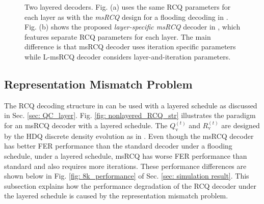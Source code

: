\documentclass [PhD] {uclathes}
\begin{document}
\begin{figure}[t] 
    \centering
\hfill
  \caption{ Two layered decoders. Fig. (a) uses the same RCQ parameters for each layer as with the  \textit{msRCQ} design for a flooding decoding in \cite{Wang2020-RCQ}. Fig. (b) shows the proposed \textit{layer-specific msRCQ} decoder in \cite{Terrill2021-ec}, which features  separate RCQ parameters for each layer.
  The main difference is that msRCQ decoder uses iteration specific parameters while L-msRCQ decoder considers layer-and-iteration parameters.
  }
\end{figure}

\subsection{Representation Mismatch Problem}
The RCQ decoding structure in \cite{Wang2020-RCQ} can be used with a layered schedule as discussed in Sec. \ref{sec: QC_layer}. Fig. \ref{fig: nonlayered_RCQ_str} illustrates the paradigm for an msRCQ decoder with a layered schedule. The $Q_\text{v}^{(t)}$ and $R_\text{v}^{(t)}$ are designed by the HDQ discrete density evolution as in \cite{Wang2020-RCQ}. Even though the msRCQ decoder has better FER performance than the standard \minsum decoder under a flooding schedule\cite{Wang2020-RCQ}, under a layered schedule, msRCQ has worse FER performance than standard \minsum and also requires more iterations.  These performance differences are shown below in Fig.  \ref{fig: 8k_performance} of Sec. \ref{sec: simulation result}. This subsection explains how the performance degradation of the RCQ decoder under the layered schedule is caused by the representation mismatch problem. 
\end{document}
